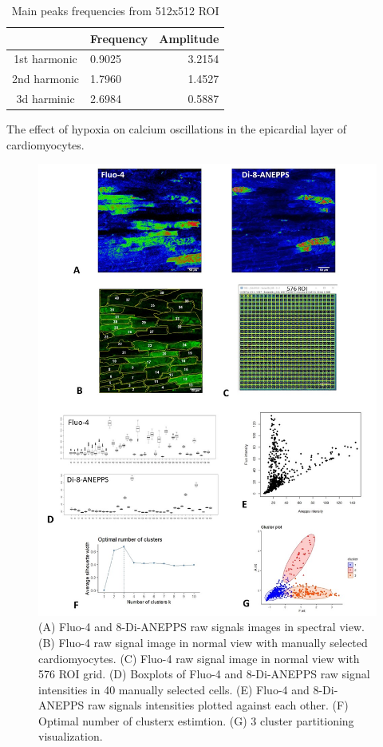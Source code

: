 \documentclass{biophys-new}
\begin{document}
\begin{table}[hb!]
\caption{Main peaks frequencies from 512x512 ROI}
\label{tab:freq}
\centering
\begin{threeparttable}
\begin{tabular}{c l r}
\hline
 & Frequency & Amplitude  \\\hline
1st harmonic & 0.9025 & 3.2154 \\
2nd harmonic & 1.7960 & 1.4527  \\
3d harminic & 2.6984 & 0.5887    \\
\hline
\end{tabular}
\begin{tablenotes}
\end{tablenotes}
\end{threeparttable}
\end{table}


The effect of hypoxia on calcium oscillations in the epicardial layer of cardiomyocytes.

\begin{figure}
    \includegraphics[width=0.9\linewidth]{fig4.jpg}
    \caption{(A) Fluo-4 and 8-Di-ANEPPS raw signals images in spectral view.  (B) Fluo-4 raw signal image in normal view with manually selected cardiomyocytes. (C) Fluo-4 raw signal image in normal view with 576 ROI grid. (D) Boxplots of Fluo-4 and 8-Di-ANEPPS raw signal intensities in 40 manually selected cells. (E) Fluo-4 and 8-Di-ANEPPS raw signals intensities plotted against each other. (F) Optimal number of clusterx estimtion. (G) 3 cluster partitioning visualization.}
    \label{fig:fig4}
\end{figure}
\end{document}
